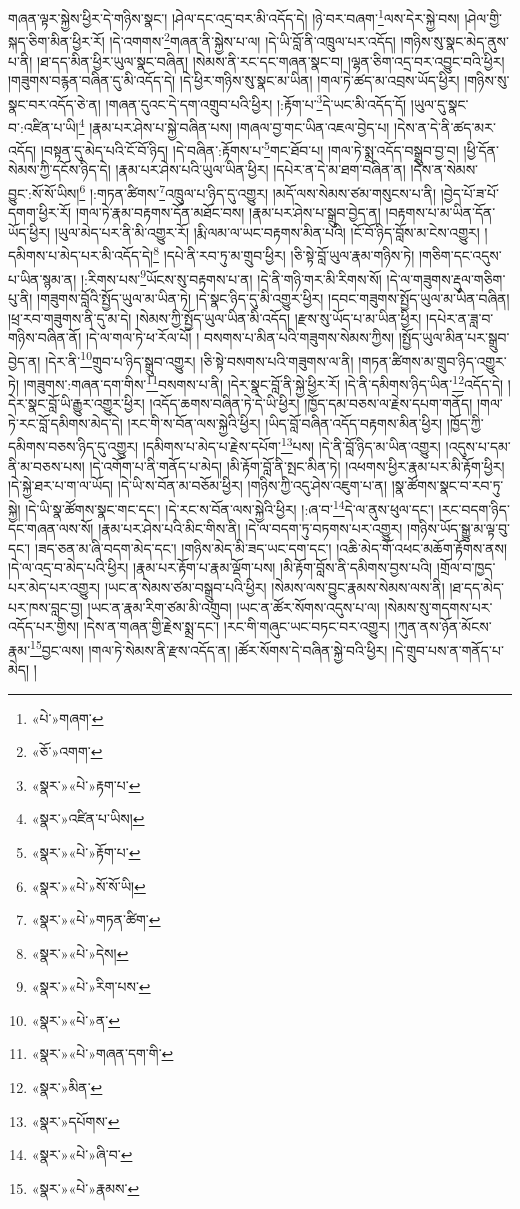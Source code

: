 གཞན་ལྟར་སྐྱེས་ཕྱིར་དེ་གཉིས་སྣང་། །ཤེལ་དང་འདྲ་བར་མི་འདོད་དེ། །ཉེ་བར་བཞག་\footnote{«པེ་»གཞག་}ལས་དེར་སྐྱེ་བས། །ཤེལ་གྱི་སྐད་ཅིག་མིན་ཕྱིར་རོ། །དེ་འགགས་\footnote{«ཅོ་»འགག་}གཞན་ནི་སྐྱེས་པ་ལ། །དེ་ཡི་བློ་ནི་འཁྲུལ་པར་འདོད། །གཉིས་སུ་སྣང་མེད་ནུས་པ་ནི། །ཐ་དད་མིན་ཕྱིར་ཡུལ་སྣང་བཞིན། །སེམས་ནི་རང་དང་གཞན་སྣང་བ། །ལྷན་ཅིག་འདྲ་བར་འབྱུང་བའི་ཕྱིར། །གཟུགས་བརྙན་བཞིན་དུ་མི་འདོད་དེ། །དེ་ཕྱིར་གཉིས་སུ་སྣང་མ་ཡིན། །གལ་ཏེ་ཚད་མ་འབྲས་ཡོད་ཕྱིར། །གཉིས་སུ་སྣང་བར་འདོད་ཅེ་ན། །གཞན་དུའང་དེ་དག་འགྲུབ་པའི་ཕྱིར། །:རྟོག་པ་\footnote{«སྣར་»«པེ་»རྟག་པ་}དེ་ཡང་མི་འདོད་དོ། །ཡུལ་དུ་སྣང་བ་:འཛིན་པ་ཡི།\footnote{«སྣར་»འཛིན་པ་ཡིས།} །རྣམ་པར་ཤེས་པ་སྐྱེ་བཞིན་པས། །གཞལ་བྱ་གང་ཡིན་འཇལ་བྱེད་པ། །དེས་ན་དེ་ནི་ཚད་མར་འདོད། །བསྟན་དུ་མེད་པའི་ངོ་བོ་ཉིད། །དེ་བཞིན་:རྟོགས་པ་\footnote{«སྣར་»«པེ་»རྟོག་པ་}གང་ཐོབ་པ། །གལ་ཏེ་སྨྲ་འདོད་བསྒྲུབ་བྱ་བ། །ཕྱི་དོན་སེམས་ཀྱི་དངོས་ཉིད་དེ། །རྣམ་པར་ཤེས་པའི་ཡུལ་ཡིན་ཕྱིར། །དཔེར་ན་དེ་མ་ཐག་བཞིན་ན། །དེས་ན་སེམས་བྱུང་:སོ་སོ་ཡིས།\footnote{«སྣར་»«པེ་»སོ་སོ་ཡི།} །:གཏན་ཚིགས་\footnote{«སྣར་»«པེ་»གཏན་ཚིག་}འཁྲུལ་པ་ཉིད་དུ་འགྱུར། །མདོ་ལས་སེམས་ཙམ་གསུངས་པ་ནི། །བྱེད་པོ་ཟ་པོ་དགག་ཕྱིར་རོ། །གལ་ཏེ་རྣམ་བརྟགས་དོན་མཐོང་བས། །རྣམ་པར་ཤེས་པ་སྒྲུབ་བྱེད་ན། །བརྟགས་པ་མ་ཡིན་དོན་ཡོད་ཕྱིར། །ཡུལ་མེད་པར་ནི་མི་འགྱུར་རོ། །རྨི་ལམ་ལ་ཡང་བརྟགས་མིན་པའི། །ངོ་བོ་ཉིད་བློས་མ་ངེས་འགྱུར། །དམིགས་པ་མེད་པར་མི་འདོད་དེ།\footnote{«སྣར་»«པེ་»དེས།} །དཔེ་ནི་རབ་ཏུ་མ་གྲུབ་ཕྱིར། །ཅི་སྟེ་བློ་ཡུལ་རྣམ་གཉིས་ཏེ། །གཅིག་དང་འདུས་པ་ཡིན་སྙམ་ན། །:རིགས་པས་\footnote{«སྣར་»«པེ་»རིག་པས་}ཡོངས་སུ་བརྟགས་པ་ན། །དེ་ནི་གཉི་གར་མི་རིགས་སོ། །དེ་ལ་གཟུགས་རྡུལ་གཅིག་པུ་ནི། །གཟུགས་བློའི་སྤྱོད་ཡུལ་མ་ཡིན་ཏེ། །དེ་སྣང་ཉིད་དུ་མི་འགྱུར་ཕྱིར། །དབང་གཟུགས་སྤྱོད་ཡུལ་མ་ཡིན་བཞིན། །ཕྲ་རབ་གཟུགས་ནི་དུ་མ་དེ། །སེམས་ཀྱི་སྤྱོད་ཡུལ་ཡིན་མི་འདོད། །རྫས་སུ་ཡོད་པ་མ་ཡིན་ཕྱིར། །དཔེར་ན་ཟླ་བ་གཉིས་བཞིན་ནོ། །དེ་ལ་གལ་ཏེ་ཕ་རོལ་པོ། །
བསགས་པ་མིན་པའི་གཟུགས་སེམས་ཀྱིས། །སྤྱོད་ཡུལ་མིན་པར་སྒྲུབ་བྱེད་ན། །དེར་ནི་\footnote{«སྣར་»«པེ་»ན་}གྲུབ་པ་ཉིད་སྒྲུབ་འགྱུར། །ཅི་སྟེ་བསགས་པའི་གཟུགས་ལ་ནི། །གཏན་ཚིགས་མ་གྲུབ་ཉིད་འགྱུར་ཏེ། །གཟུགས་:གཞན་དག་གིས་\footnote{«སྣར་»«པེ་»གཞན་དག་གི་}བསགས་པ་ནི། །དེར་སྣང་བློ་ནི་སྐྱེ་ཕྱིར་རོ། །དེ་ནི་དམིགས་ཉིད་ཡིན་\footnote{«སྣར་»མིན་}འདོད་དེ། །དེར་སྣང་བློ་ཡི་རྒྱུར་འགྱུར་ཕྱིར། །འདོད་ཆགས་བཞིན་ཏེ་དེ་ཡི་ཕྱིར། །ཁྱོད་དམ་བཅས་ལ་རྗེས་དཔག་གནོད། །གལ་ཏེ་རང་བློ་དམིགས་མེད་དེ། །རང་གི་ས་བོན་ལས་སྐྱེའི་ཕྱིར། །ཡིད་བློ་བཞིན་འདོད་བརྟགས་མིན་ཕྱིར། །ཁྱོད་ཀྱི་དམིགས་བཅས་ཉིད་དུ་འགྱུར། །དམིགས་པ་མེད་པ་རྗེས་དཔོག་\footnote{«སྣར་»དཔོགས་}པས། །དེ་ནི་བློ་ཉིད་མ་ཡིན་འགྱུར། །འདུས་པ་དམ་ནི་མ་བཅས་པས། །དེ་འགོག་པ་ནི་གནོད་པ་མེད། །མི་རྟོག་བློ་ནི་སྤང་མིན་ཏེ། །འཕགས་ཕྱིར་རྣམ་པར་མི་རྟོག་ཕྱིར། །དེ་སྐྱེ་ཐར་པ་ག་ལ་ཡོད། །དེ་ཡི་ས་བོན་མ་བཅོམ་ཕྱིར། །གཉིས་ཀྱི་འདུ་ཤེས་འཇུག་པ་ན། །སྣ་ཚོགས་སྣང་བ་རབ་ཏུ་སྐྱེ། །དེ་ཡི་སྣ་ཚོགས་སྣང་གང་དང་། །དེ་རང་ས་བོན་ལས་སྐྱེའི་ཕྱིར། །:ཞ་བ་\footnote{«སྣར་»«པེ་»ཞི་བ་}དེ་ལ་ནུས་ཕུལ་དང་། །རང་བདག་ཉིད་དང་གཞན་ལས་སོ། །རྣམ་པར་ཤེས་པའི་མིང་གིས་ནི། །དེ་ལ་བདག་ཏུ་བཏགས་པར་འགྱུར། །གཉིས་ཡོད་སྒྱུ་མ་ལྟ་བུ་དང་། །ཟད་ཅན་མ་ཞི་བདག་མེད་དང་། །གཉིས་མེད་མི་ཟད་ཡང་དག་དང་། །འཆི་མེད་གོ་འཕང་མཆོག་རྟོགས་ནས། །དེ་ལ་འདྲ་བ་མེད་པའི་ཕྱིར། །རྣམ་པར་རྟོག་པ་རྣམ་ལྡོག་པས། །མི་རྟོག་བློས་ནི་དམིགས་བྱས་པའི། །གྲོལ་བ་ཁྱད་པར་མེད་པར་འགྱུར། །ཡང་ན་སེམས་ཙམ་བསྒྲུབ་པའི་ཕྱིར། །སེམས་ལས་བྱུང་རྣམས་སེམས་ལས་ནི། །ཐ་དད་མེད་པར་ཁས་བླང་བྱ། །ཡང་ན་རྣམ་རིག་ཙམ་མི་འགྲུབ། །ཡང་ན་ཚོར་སོགས་འདུས་པ་ལ། །སེམས་སུ་གདགས་པར་འདོད་པར་གྱིས། །དེས་ན་གཞན་གྱི་རྗེས་སྨྲ་དང་། །རང་གི་གཞུང་ཡང་བཏང་བར་འགྱུར། །ཀུན་ནས་ཉོན་མོངས་རྣམ་\footnote{«སྣར་»«པེ་»རྣམས་}བྱང་ལས། །གལ་ཏེ་སེམས་ནི་རྫས་འདོད་ན། །ཚོར་སོགས་དེ་བཞིན་སྐྱེ་བའི་ཕྱིར། །དེ་གྲུབ་པས་ན་གནོད་པ་མེད། །
